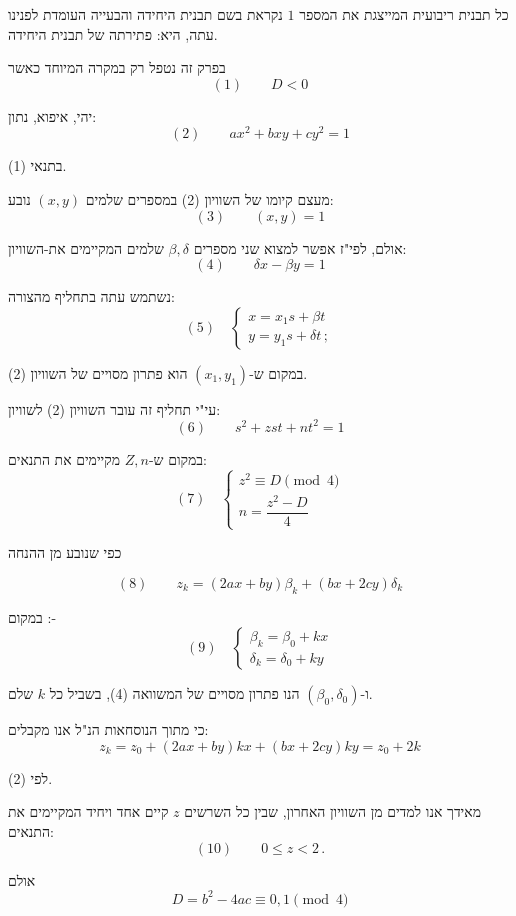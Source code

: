 \noindent כל תבנית ריבועית המייצגת את המספר $1$ נקראת בשם תבנית היחידה
והבעייה העומדת לפנינו עתה, היא: פתירתה של תבנית היחידה.

\noindent בפרק זה נטפל רק במקרה המיוחד כאשר
\[ (1) \qquad D < 0 \]

\noindent יהי, איפוא, נתון:
\[ (2) \qquad ax^2 + bxy + cy^2 = 1 \]

\noindent בתנאי (1).

\noindent מעצם קיומו של השוויון (2) במספרים שלמים $(x,y)$ נובע:
\[ (3) \qquad (x,y) = 1 \]

\noindent אולם, לפי"ז אפשר למצוא שני מספרים $\beta, \delta$ שלמים המקיימים את-השוויון:
\[ (4) \qquad \delta x - \beta y = 1 \]

\noindent נשתמש עתה בתחליף מהצורה:
\[ (5) \quad \left\{ \begin{array}{l}
x = x_1 s + \beta t \\
y = y_1 s + \delta t \, ;
\end{array} \right. \]

\noindent במקום ש-$(x_1, y_1)$ הוא פתרון מסויים של השוויון (2).

\noindent עי"י תחליף זה עובר השוויון (2) לשוויון:
\[ (6) \qquad s^2 + zst + nt^2 = 1 \]

\noindent במקום ש-$Z, n$ מקיימים את התנאים:
\[ (7) \quad \left\{ \begin{array}{l}
z^2 \equiv D \pmod{4} \\[4pt]
n = \dfrac{z^2 - D}{4}
\end{array} \right. \]

\noindent כפי שנובע מן ההנחה

\[ (8) \qquad z_k = (2ax+by)\beta_k + (bx+2cy)\delta_k \]

\noindent במקום :-
\[ (9) \quad \left\{ \begin{array}{l}
\beta_k = \beta_0 + kx \\
\delta_k = \delta_0 + ky
\end{array} \right. \]

\noindent ו-$(\beta_0, \delta_0)$ הנו פתרון מסויים של המשוואה (4), בשביל כל $k$ שלם.

\noindent כי מתוך הנוסחאות הנ"ל אנו מקבלים:
\[ z_k = z_0 + (2ax+by)kx + (bx+2cy)ky = z_0 + 2k \]

\noindent לפי (2).

\noindent מאידך אנו למדים מן השוויון האחרון, שבין כל השרשים $z$ קיים
אחד ויחיד המקיימים את התנאים:
\[ (10) \qquad 0 \le z < 2 \, . \]

\noindent אולם
\[ D = b^2 - 4ac \equiv 0, 1 \pmod{4} \]

